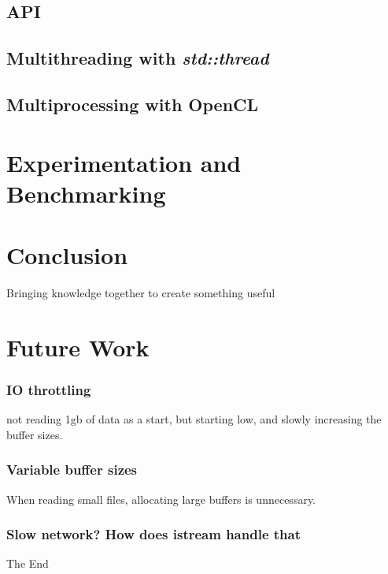 \documentclass[a4paper]{article}
\begin{document}
\subsection{API}



\subsection{Multithreading with \textit{std::thread}}




\subsection{Multiprocessing with OpenCL}


\newpage
\section{Experimentation and Benchmarking}


\newpage
\section{Conclusion}
Bringing knowledge together to create something useful



\section{Future Work}
\subsubsection{IO throttling}
not reading 1gb of data as a start, but starting low, and slowly increasing the buffer sizes.

\subsubsection{Variable buffer sizes}
When reading small files, allocating large buffers is unnecessary.

\subsubsection{Slow network? How does istream handle that}





The End \\\\\\\\\\\\\\\\\\
\end{document}
